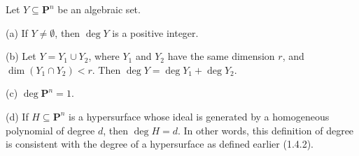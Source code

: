 Let $Y \subseteq \mathbf{P}^n$ be an algebraic set.

(a) If $Y \neq \emptyset$, then $\deg Y$ is a positive integer.

(b) Let $Y = Y_1 \cup Y_2$, where $Y_1$ and $Y_2$ have the same dimension $r$, and $\dim(Y_1 \cap Y_2) < r$. Then $\deg Y = \deg Y_1 + \deg Y_2$.

(c) $\deg \mathbf{P}^n = 1$.

(d) If $H \subseteq \mathbf{P}^n$ is a hypersurface whose ideal is generated by a homogeneous polynomial of degree $d$, then $\deg H = d$. In other words, this definition of degree is consistent with the degree of a hypersurface as defined earlier (1.4.2).
